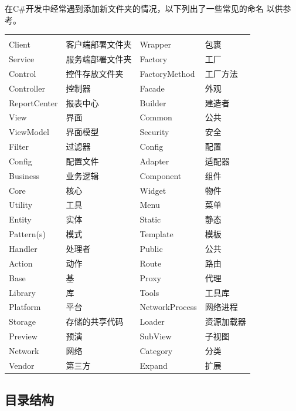 \documentclass{book}
\begin{document}
在C\#开发中经常遇到添加新文件夹的情况，以下列出了一些常见的命名
以供参考。

\begin{tabular}{ll|ll}
	\multirow{1}{*}{}			
	& \multicolumn{1}{c}{}
	& \multicolumn{1}{c}{}
	& \multicolumn{1}{c}{}\\
	Client & 客户端部署文件夹 & Wrapper & 包裹\\
	Service & 服务端部署文件夹 & Factory & 工厂\\	
	Control & 控件存放文件夹 & FactoryMethod & 工厂方法\\
	Controller & 控制器 & Facade & 外观\\
	ReportCenter & 报表中心 & Builder & 建造者\\
	View & 界面 & Common & 公共\\
	ViewModel & 界面模型 & Security & 安全\\
	Filter & 过滤器 & Config & 配置\\
	Config & 配置文件 & Adapter & 适配器\\
	Business & 业务逻辑 & Component & 组件 \\
	Core & 核心 & Widget & 物件\\
	Utility & 工具 & Menu & 菜单\\
	Entity & 实体 & Static & 静态\\
	Pattern(s) & 模式 & Template & 模板\\
	Handler & 处理者 & Public\footnotemark[1] & 公共\\
	Action & 动作 & Route & 路由\\
	Base & 基 & Proxy & 代理\\ 
	Library & 库 & Tools & 工具库 \\
    Platform & 平台 & NetworkProcess & 网络进程 \\
    Storage & 存储的共享代码 & Loader & 资源加载器\\
    Preview\footnotemark[2] & 预演 & SubView & 子视图\\
    Network & 网络 & Category & 分类\\
    Vendor\footnotemark[3] & 第三方 & Expand & 扩展\\
\end{tabular}


\subsection{目录结构}
\end{document}

